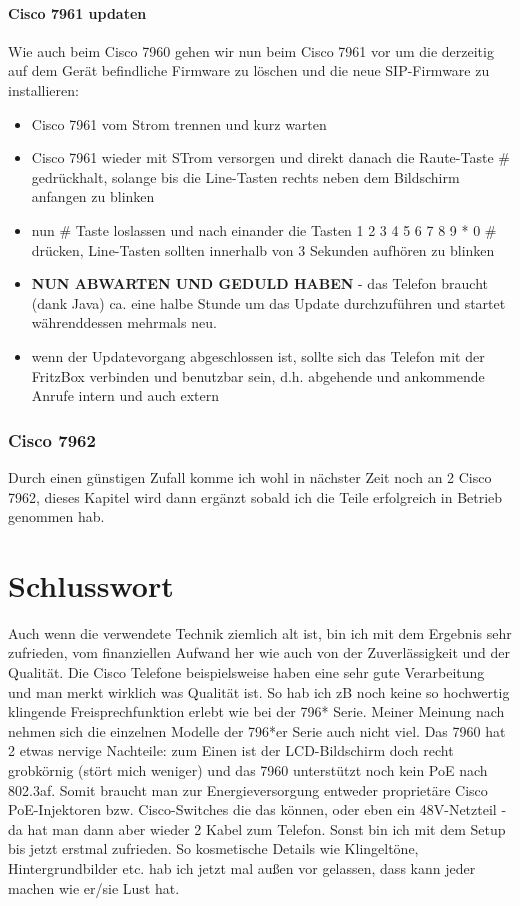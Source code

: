 \documentclass[a4paper,12pt]{scrbook}
\begin{document}
\subsubsection{Cisco 7961 updaten}
Wie auch beim Cisco 7960 gehen wir nun beim Cisco 7961 vor um die derzeitig auf dem Gerät befindliche Firmware zu löschen und die neue SIP-Firmware zu installieren:

\begin{itemize}
 \item Cisco 7961 vom Strom trennen und kurz warten 
 \item Cisco 7961 wieder mit STrom versorgen und direkt danach die Raute-Taste \# gedrückhalt, solange bis die Line-Tasten rechts neben dem Bildschirm anfangen zu blinken
 \item nun \# Taste loslassen und nach einander die Tasten 1 2 3 4 5 6 7 8 9 * 0 \# drücken, Line-Tasten sollten innerhalb von 3 Sekunden aufhören zu blinken
 \item \textbf{NUN ABWARTEN UND GEDULD HABEN} - das Telefon braucht (dank Java) ca. eine halbe Stunde um das Update durchzuführen und startet währenddessen mehrmals neu. 
 \item wenn der Updatevorgang abgeschlossen ist, sollte sich das Telefon mit der FritzBox verbinden und benutzbar sein, d.h. abgehende und ankommende Anrufe intern und auch extern
\end{itemize}

\subsection{Cisco 7962}
Durch einen günstigen Zufall komme ich wohl in nächster Zeit noch an 2 Cisco 7962, dieses Kapitel wird dann ergänzt sobald ich die Teile erfolgreich in Betrieb genommen hab.

\chapter{Schlusswort}
Auch wenn die verwendete Technik ziemlich alt ist, bin ich mit dem Ergebnis sehr zufrieden, vom finanziellen Aufwand her wie auch von der Zuverlässigkeit und der Qualität. 
Die Cisco Telefone beispielsweise haben eine sehr gute Verarbeitung und man merkt wirklich
was Qualität ist. So hab ich zB noch keine so hochwertig klingende Freisprechfunktion erlebt wie bei der 796* Serie. Meiner Meinung nach nehmen sich die einzelnen Modelle der 796*er Serie auch nicht viel.
Das 7960 hat 2 etwas nervige Nachteile: zum Einen ist der LCD-Bildschirm doch recht grobkörnig (stört mich weniger) und das 7960 unterstützt noch kein PoE nach 802.3af. Somit braucht
man zur Energieversorgung entweder proprietäre Cisco PoE-Injektoren bzw. Cisco-Switches die das können, oder eben ein 48V-Netzteil - da hat man dann aber wieder 2 Kabel zum Telefon.
Sonst bin ich mit dem Setup bis jetzt erstmal zufrieden. So kosmetische Details wie Klingeltöne, Hintergrundbilder etc. hab ich jetzt mal außen vor gelassen, dass kann jeder machen wie er/sie 
Lust hat. 
\end{document}
